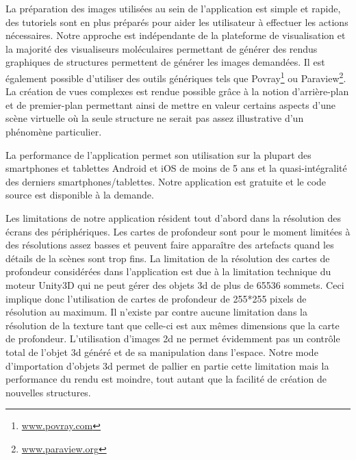 La préparation des images utilisées au sein de l'application est simple et rapide, des tutoriels sont en plus préparés pour aider les utilisateur à effectuer les actions nécessaires. Notre approche est indépendante de la plateforme de visualisation et la majorité des visualiseurs moléculaires permettant de générer des rendus graphiques de structures permettent de générer les images demandées. Il est également possible d'utiliser des outils génériques tels que Povray\footnote{\url{www.povray.com}} ou Paraview\footnote{\url{www.paraview.org}}. La création de vues complexes est rendue possible grâce à la notion d'arrière-plan et de premier-plan permettant ainsi de mettre en valeur certains aspects d'une scène virtuelle où la seule structure ne serait pas assez illustrative d'un phénomène particulier.

La performance de l'application permet son utilisation sur la plupart des smartphones et tablettes Android et iOS de moins de 5 ans et la quasi-intégralité des derniers smartphones/tablettes. Notre application est gratuite et le code source est disponible à la demande.

Les limitations de notre application résident tout d'abord dans la résolution des écrans des périphériques. Les cartes de profondeur sont pour le moment limitées à des résolutions assez basses et peuvent faire apparaître des artefacts quand les détails de la scènes sont trop fins. La limitation de la résolution des cartes de profondeur considérées dans l'application est due à la limitation technique du moteur Unity3D qui ne peut gérer des objets 3d de plus de 65536 sommets. Ceci implique donc l'utilisation de cartes de profondeur de 255*255 pixels de résolution au maximum. Il n'existe par contre aucune limitation dans la résolution de la texture tant que celle-ci est aux mêmes dimensions que la carte de profondeur. L'utilisation d'images 2d ne permet évidemment pas un contrôle total de l'objet 3d généré et de sa manipulation dans l'espace. Notre mode d'importation d'objets 3d permet de pallier en partie cette limitation mais la performance du rendu est moindre, tout autant que la facilité de création de nouvelles structures.






